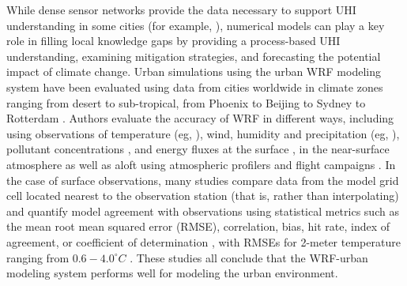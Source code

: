 \documentclass[draft,linenumbers]{agujournal}
\begin{document}
While dense sensor networks provide the data necessary to support UHI understanding in some cities (for example, \cite{scott2017intraurban,scott2017temperature,madisonUHI,minneapolisUHI,tokyoUHI}), numerical models can play a key role in filling local knowledge gaps by providing a process-based UHI understanding, examining mitigation strategies, and forecasting the potential impact of climate change. 
Urban simulations using the urban WRF modeling system \citep{chen2011integrated} have been evaluated using data from cities worldwide in climate zones ranging from desert to sub-tropical, from Phoenix \citep{georgescu2013summer} to Beijing \citep{wang2013modeling} to Sydney \citep{argueso2014temperature} to Rotterdam \citep{theeuwes2014seasonal}. 
Authors evaluate the accuracy of WRF in different ways,
including using observations of temperature (eg, \citet{kusaka2012numerical}), wind, humidity and precipitation (eg, \cite{miao2011impacts,chen2011numerical}), pollutant concentrations \citep{brioude2013top}, and energy fluxes at the surface \citep{yang2015enhancing,loridan2012multi}, in the near-surface atmosphere as well as aloft using atmospheric profilers and flight campaigns \citep{li2013development}. 
In the case of surface observations, many studies compare data from the model grid cell located nearest to the observation station (that is, rather than interpolating) and quantify model agreement with observations using statistical metrics such as the mean root mean squared error (RMSE), correlation, bias, hit rate, index of agreement, or coefficient of determination \citep{loridan2010trade,salamanca2011study,lee2011evaluation,chen2011numerical,chen2014wrf,li2013multi}, with RMSEs for 2-meter temperature ranging from $0.6-4.0^\circ C$ \citep{kim2013evaluation}. These studies 
all conclude that the WRF-urban modeling system performs well for modeling the urban environment. %
\end{document}
